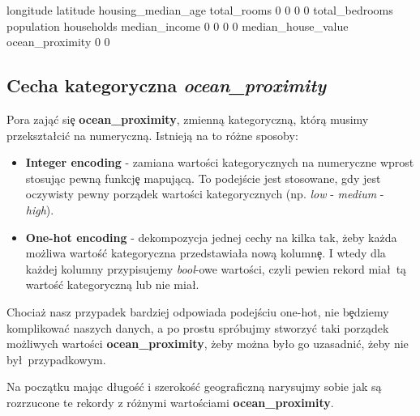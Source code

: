 \documentclass{article}
\begin{document}
\begin{Schunk}
\begin{Soutput}
         longitude           latitude housing_median_age        total_rooms 
                 0                  0                  0                  0 
    total_bedrooms         population         households      median_income 
                 0                  0                  0                  0 
median_house_value    ocean_proximity 
                 0                  0 
\end{Soutput}
\end{Schunk}

\subsection{Cecha kategoryczna \textit{ocean\_proximity}}
\quad Pora zają\'c si\c e \textbf{ocean\_proximity}, zmienną kategoryczną, którą musimy przekszta\l ci\'c na numeryczną. Istnieją na to różne sposoby:

\begin{itemize}
  \item \textbf{Integer encoding} - zamiana wartości kategorycznych na numeryczne wprost stosując pewną funkcj\c e mapującą. To podejście jest stosowane, gdy jest oczywisty pewny porządek wartości kategorycznych (np. \textit{low} - \textit{medium} - \textit{high}).
  \item \textbf{One-hot encoding} - dekompozycja jednej cechy na kilka tak, żeby każda możliwa wartoś\'c kategoryczna przedstawia\l a nową kolumn\c e. I wtedy dla każdej kolumny przypisujemy \textit{bool}-owe wartości, czyli pewien rekord mia\l\ tą wartoś\'c kategoryczną lub nie mia\l.
\end{itemize}

\noindent
\quad Chociaż nasz przypadek bardziej odpowiada podejściu one-hot, nie b\c edziemy komplikowa\'c naszych danych, a po prostu spróbujmy stworzy\'c taki porządek możliwych wartości \textbf{ocean\_proximity}, żeby można by\l o go uzasadni\'c, żeby nie by\l\ przypadkowym.

\noindent
\quad Na początku mając d\l ugoś\'c i szerokoś\'c geograficzną narysujmy sobie jak są rozrzucone te rekordy z różnymi wartościami \textbf{ocean\_proximity}.
\end{document}
